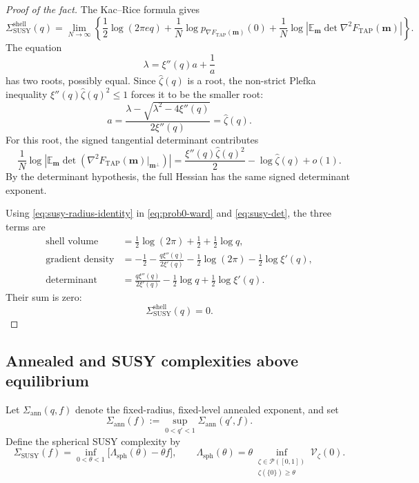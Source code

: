 \documentclass[a4paper,10pt,reqno]{amsart}
\numberwithin{equation}{section}
\newcommand{\dE}{\mathbb{E}}%
\newcommand{\mc}{\mathcal}
\newcommand{\TAP}{\mathrm{TAP}}
\newcommand{\bfm}{\mathbf{m}}
\newcommand{\zhat}{\widehat\zeta}
\begin{document}
	\begin{proof}[Proof of the fact]
		The Kac--Rice formula gives
		\[
		\Sigma_{\mathrm{SUSY}}^{\mathrm{shell}}(q)
		=\lim_{N\to\infty}
		\left\{
		\frac12\log(2\pi e q)
		+\frac1N\log p_{\nabla F_{\TAP}(\bfm)}(0)
		+\frac1N\log\left|
		\dE_\bfm\det\nabla^2F_{\TAP}(\bfm)
		\right|
		\right\}.
		\]
		The equation
		\[
		\lambda=\xi''(q)a+\frac1a
		\]
		has two roots, possibly equal. Since \(\zhat(q)\) is a root, the non-strict
		Plefka inequality \(\xi''(q)\zhat(q)^2\le1\) forces it to be the smaller
		root:
		\[
		a
		=
		\frac{
			\lambda-\sqrt{\lambda^2-4\xi''(q)}
		}{
			2\xi''(q)
		}
		=
		\zhat(q).
		\]
		For this root, the signed tangential determinant contributes
		\begin{equation}\label{eq:susy-det}
			\frac1N\log\left|
			\dE_\bfm\det\left(
			\nabla^2F_{\TAP}(\bfm)|_{\bfm^\perp}
			\right)
			\right|
			=\frac{\xi''(q)\zhat(q)^2}{2}-\log\zhat(q)+o(1).
		\end{equation}
		By the determinant hypothesis, the full Hessian has the same signed
		determinant exponent.
		
		Using \eqref{eq:susy-radius-identity} in \eqref{eq:prob0-ward} and
		\eqref{eq:susy-det}, the three terms are
		\begin{align*}
			\text{shell volume}
			&=\frac12\log(2\pi)+\frac12+\frac12\log q,\\
			\text{gradient density}
			&=-\frac12-\frac{q\xi''(q)}{2\xi'(q)}
			-\frac12\log(2\pi)-\frac12\log\xi'(q),\\
			\text{determinant}
			&=\frac{q\xi''(q)}{2\xi'(q)}
			-\frac12\log q+\frac12\log\xi'(q).
		\end{align*}
		Their sum is zero:
		\[
		\Sigma_{\mathrm{SUSY}}^{\mathrm{shell}}(q)=0.
		\]
	\end{proof}
	
	\subsection{Annealed and SUSY complexities above equilibrium}
	
	Let \(\Sigma_{\mathrm{ann}}(q,f)\) denote the fixed-radius,
	fixed-level annealed exponent, and set
	\[
	\Sigma_{\mathrm{ann}}(f)
	:=
	\sup_{0<q'<1}\Sigma_{\mathrm{ann}}(q',f).
	\]
	Define the spherical SUSY complexity by
	\begin{equation}\label{eq:cex-susy-def}
		\Sigma_{\mathrm{SUSY}}(f)
		=\inf_{0<\theta<1}\bigl[\Lambda_{\mathrm{sph}}(\theta)-\theta f\bigr],
		\qquad
		\Lambda_{\mathrm{sph}}(\theta)
		=\theta
		\inf_{\substack{\zeta\in\mc P([0,1])\\
				\zeta(\{0\})\ge\theta}}
		\mathcal V_\zeta(0).
	\end{equation}
	
\end{document}
